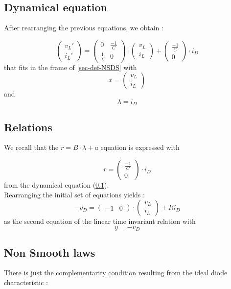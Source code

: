 \documentclass[10pt]{article}
\begin{document}
\subsection{Dynamical equation}
\label{sec-dyn-eq}
After rearranging the previous equations, we obtain :

\[ 
\left( \begin{array}{c}
v_L'\\
i_L'
\end{array} \right)
=
\left( \begin{array}{cc}
0 & \frac{-1}{C}\\
\frac{1}{L} & 0
\end{array} \right)
 \cdot
\left( \begin{array}{c}
v_L\\
i_L
\end{array} \right)
+
\left( \begin{array}{c}
\frac{-1}{C}\\
 0
\end{array} \right)
 \cdot i_D
\]
that fits in the frame of \ref{sec-def-NSDS} with
\[
x = 
\left( \begin{array}{c}
v_L\\
i_L
\end{array} \right)
\]
and 
\[
\lambda = i_D
\]



\subsection{Relations}
We recall that the $r = B \cdot \lambda + a$ equation is expressed with

\[
r =
\left( \begin{array}{c}
\frac{-1}{C}\\
 0
\end{array} \right)
 \cdot i_D
\]
from the dynamical equation (\ref{sec-dyn-eq}).\\
Rearranging the initial set of equations yields :
\[
-v_D = 
\left( \begin{array}{cc}
-1 & 0
\end{array} \right)
 \cdot
\left( \begin{array}{c}
v_L\\
i_L
\end{array} \right)
+ R i_D
\]
as the second equation of the linear time invariant relation with 
\[
y = -v_D
\]



\subsection{Non Smooth laws}
\label{Non Smooth laws}
There is just the complementarity condition resulting from the ideal diode characteristic :
\end{document}
